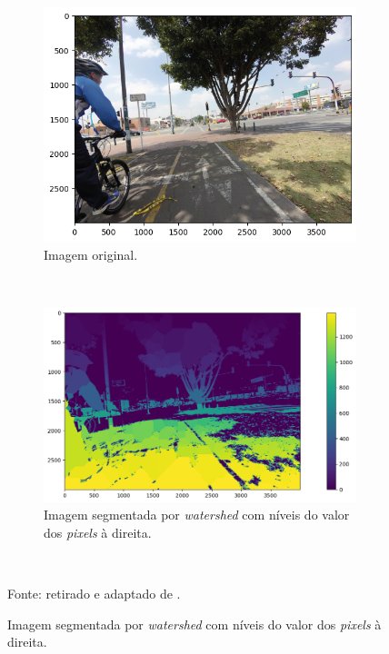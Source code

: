 \begin{figure}[H]
   \caption[Segmentação com \textit{watershed}.]{Exemplos de segmentação com a aplicação de \textit{watershed}.}
   \centering
   \label{segment:fig:watershed_1}
    \begin{subfigure}[t]{0.5\textwidth}
        \centering
        \includegraphics[width=1\linewidth]{recursos/imagens/image_seg/original_watershed.png}
        \caption{Imagem original.}
        \label{segment:fig:watershed_1.1}
    \end{subfigure}%
    ~ 

    \begin{subfigure}[t]{0.5\textwidth}
        \centering
        \includegraphics[width=1\linewidth]{recursos/imagens/image_seg/segmented_watershed.png}
        \caption{Imagem segmentada por \textit{watershed} com níveis do valor dos \textit{pixels} à direita.}
        \label{segment:fig:watershed_1.2}
    \end{subfigure}%
    ~

    Fonte: retirado e adaptado de \cite{Neuhold2017_ICCV}.
\end{figure}


